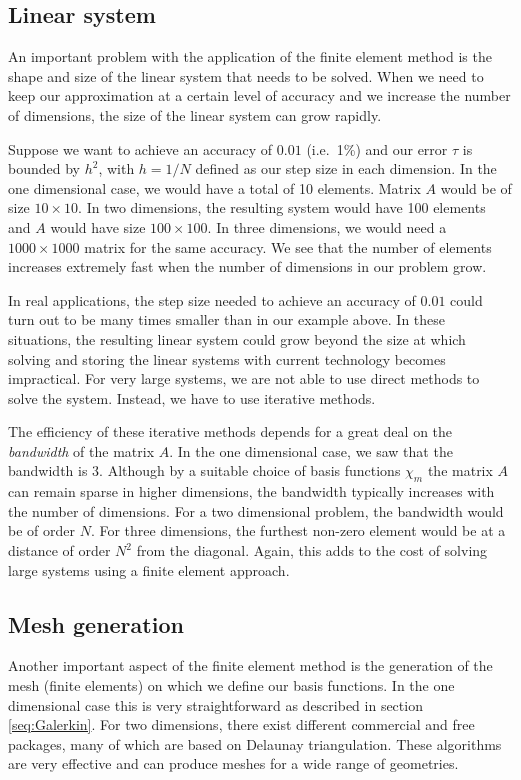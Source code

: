 \documentclass[a4paper]{article}
\begin{document}
\subsection{Linear system}

An important problem with the application of the finite element method
is the shape and size of the linear system that needs to be solved.
When we need to keep our approximation at a certain level of accuracy
and we increase the number of dimensions, the size of the linear
system can grow rapidly.

Suppose we want to achieve an accuracy of $0.01$ (i.e.\ 1\%) and our
error $\tau$ is bounded by $h^2$, with $h = 1/N$ defined as our step size in
each dimension. In the one dimensional case, we would have a total of
10 elements. Matrix $A$ would be of size $10 \times 10$. In two
dimensions, the resulting system would have 100 elements and $A$ would
have size $100 \times 100$. In three dimensions, we would need a $1000
\times 1000$ matrix for the same accuracy. We see that the number of
elements increases extremely fast when the number of dimensions in our
problem grow.

In real applications, the step size needed to achieve an accuracy of
$0.01$ could turn out to be many times smaller than in our example
above. In these situations, the resulting linear system could grow
beyond the size at which solving and storing the linear systems with
current technology becomes impractical. For very large systems, we are
not able to use direct methods to solve the system. Instead, we have
to use iterative methods.

The efficiency of these iterative methods depends for a great deal on
the \emph{bandwidth} of the matrix $A$. In the one dimensional case, we
saw that the bandwidth is 3. Although by a suitable choice of basis
functions $\chi_m$ the matrix $A$ can remain sparse in higher
dimensions, the bandwidth typically increases with the number of
dimensions. For a two dimensional problem, the bandwidth would be of
order $N$. For three dimensions, the furthest non-zero element would
be at a distance of order $N^2$ from the diagonal. Again, this adds to
the cost of solving large systems using a finite element approach.

\subsection{Mesh generation}

Another important aspect of the finite element method is the
generation of the mesh (finite elements) on which we define our basis
functions. In the one dimensional case this is very straightforward
as described in section \ref{seq:Galerkin}. For two dimensions, there
exist different commercial and free packages, many of which are based
on Delaunay triangulation. These algorithms are very effective and
can produce meshes for a wide range of geometries.
\end{document}
